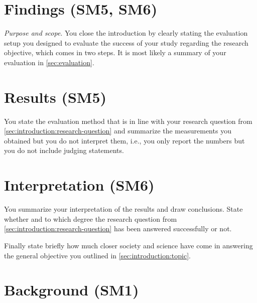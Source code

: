 \section{Findings (SM5, SM6)}\label{sec:introduction:results}

\emph{Purpose and scope}.
You close the introduction by clearly stating the evaluation setup you designed to evaluate the success of your study regarding the research objective, which comes in two steps.
It is most likely a summary of your evaluation in \cref{sec:evaluation}.

\section*{Results (SM5)}

You state the evaluation method that is in line with your research question from \cref{sec:introduction:research-question} and summarize the measurements you obtained but you do not interpret them, i.e., you only report the numbers but you do not include judging statements.

\section*{Interpretation (SM6)}

You summarize your interpretation of the results and draw conclusions.
State whether and to which degree the research question from \cref{sec:introduction:research-question} has been answered successfully or not.

Finally state briefly how much closer society and science have come in answering the general objective you outlined in \cref{sec:introduction:topic}.

\section{Background (SM1)}\label{sec:background}

